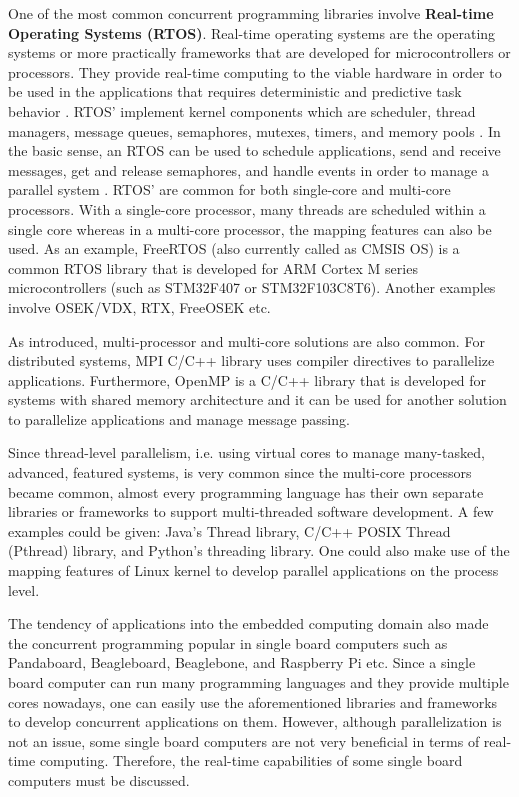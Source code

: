 One of the most common concurrent programming libraries involve \textbf{Real-time Operating Systems (RTOS)}.  Real-time operating systems are the operating systems or more practically frameworks that are developed for microcontrollers or processors. They provide real-time computing to the viable hardware in order to be used in the applications that requires deterministic and predictive task behavior \cite{rtos1}. RTOS' implement kernel components which are scheduler, thread managers, message queues, semaphores, mutexes, timers, and memory pools \cite{rtos1}. In the basic sense, an RTOS can be used to schedule applications, send and receive messages, get and release semaphores, and handle events in order to manage a parallel system \cite{rtos1}. RTOS' are common for both single-core and multi-core processors. With a single-core processor, many threads are scheduled within a single core whereas in a multi-core processor, the mapping features can also be used. As an example, FreeRTOS (also currently called as CMSIS OS) is a common RTOS library that is developed for ARM Cortex M series microcontrollers (such as STM32F407 or STM32F103C8T6). Another examples involve OSEK/VDX,  RTX, FreeOSEK etc.

As introduced, multi-processor and multi-core solutions are also common. For distributed systems, MPI C/C++ library uses compiler directives to parallelize applications. Furthermore, OpenMP is a C/C++ library that is developed for systems with shared memory architecture and it can be used for another solution to parallelize applications and manage message passing. 

Since thread-level parallelism, i.e. using virtual cores to manage many-tasked, advanced, featured systems, is very common since the multi-core processors became common, almost every programming language has their own separate libraries or frameworks to support multi-threaded software development. A few examples could be given: Java's Thread library, C/C++ POSIX Thread (Pthread) library, and Python's threading library. One could also make use of the mapping features of Linux kernel to develop parallel applications on the process level.

The tendency of applications into the embedded computing domain also made the concurrent programming popular in single board computers such as Pandaboard, Beagleboard, Beaglebone, and Raspberry Pi etc. Since a single board computer can run many programming languages and they provide multiple cores nowadays, one can easily use the aforementioned libraries and frameworks to develop concurrent applications on them. However, although parallelization is not an issue, some single board computers are not very beneficial in terms of real-time computing. Therefore, the real-time capabilities of some single board computers must be discussed.

